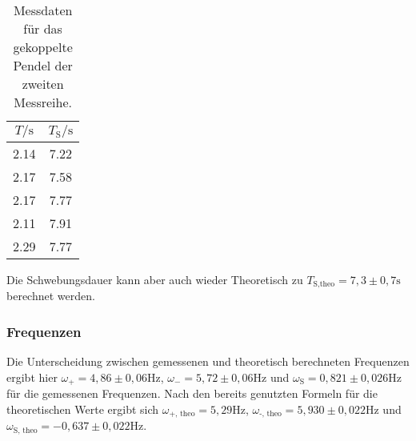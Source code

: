             \begin{table}[ht]
                \centering
                \caption{Messdaten für das gekoppelte Pendel der zweiten Messreihe.}
                \label{tab:gek2}
                \begin{tabular}{c c}
                 \toprule
                 $T / \si{\s}$ & $T_{\text{S}} / \si{\s}$\\
                 \midrule
                 2.14  &  7.22 \\
                 2.17  &  7.58 \\
                 2.17  &  7.77 \\
                 2.11  &  7.91 \\
                 2.29  &  7.77 \\
                 \bottomrule
                \end{tabular}
            \end{table}

            \noindent Die Schwebungsdauer kann aber auch wieder Theoretisch zu $T_{\text{S,theo}} = 7,3 \pm 0,7 \si{\second}$ berechnet werden.

        \subsubsection{Frequenzen}

            \noindent Die Unterscheidung zwischen gemessenen und theoretisch berechneten Frequenzen ergibt hier 
            $\omega_{+} = 4,86 \pm 0,06 \si{\hertz}$, $\omega_{-} = 5,72 \pm 0,06 \si{\hertz}$ und 
            $ \omega_{\text{S}}= 0,821 \pm 0,026 \si{\hertz}$ für die gemessenen Frequenzen. 
            Nach den bereits genutzten Formeln für die theoretischen Werte ergibt sich
            $\omega_\text{+, theo} = 5,29 \si{\hertz}$, $\omega_\text{-, theo} = 5,930 \pm 0,022 \si{\hertz}$ 
            und $\omega_\text{S, theo} = -0,637 \pm 0,022 \si{\hertz}$.


